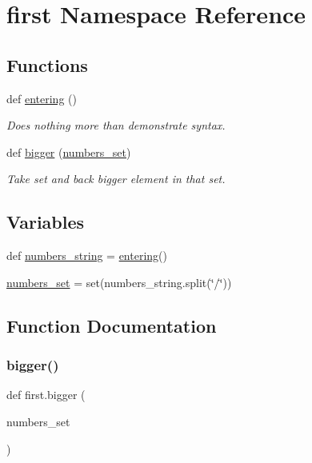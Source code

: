 \hypertarget{namespacefirst}{}\section{first Namespace Reference}
\label{namespacefirst}
\subsection*{Functions}
\begin{DoxyCompactItemize}
\item 
def \hyperlink{namespacefirst_a9a03ddbdeef73f04618eb761fdc39cd1}{entering} ()
\begin{DoxyCompactList}\small\item\em Does nothing more than demonstrate syntax. \end{DoxyCompactList}\item 
def \hyperlink{namespacefirst_ab06eae41c61247e92e6144972eccd01a}{bigger} (\hyperlink{namespacefirst_a32fbe2bb8f3fe22505c8cf9f07ee548a}{numbers\+\_\+set})
\begin{DoxyCompactList}\small\item\em Take set and back bigger element in that set. \end{DoxyCompactList}\end{DoxyCompactItemize}
\subsection*{Variables}
\begin{DoxyCompactItemize}
\item 
def \hyperlink{namespacefirst_a23a7415c8888c44472cfa540e83b3add}{numbers\+\_\+string} = \hyperlink{namespacefirst_a9a03ddbdeef73f04618eb761fdc39cd1}{entering}()
\item 
\hyperlink{namespacefirst_a32fbe2bb8f3fe22505c8cf9f07ee548a}{numbers\+\_\+set} = set(numbers\+\_\+string.\+split(\char`\"{}/\char`\"{}))
\end{DoxyCompactItemize}


\subsection{Function Documentation}
\mbox{\label{namespacefirst_ab06eae41c61247e92e6144972eccd01a}} 
\subsubsection{\texorpdfstring{bigger()}{bigger()}}
{\footnotesize\ttfamily def first.\+bigger (\begin{DoxyParamCaption}\item[{}]{numbers\+\_\+set }\end{DoxyParamCaption})}



